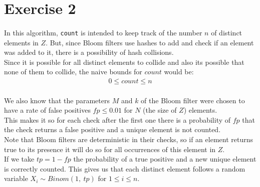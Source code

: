 \documentclass[../main.tex]{subfiles}
\begin{document}
\section{Exercise 2}
\label{sec:ex2}

\paragraph{} In this algorithm, \texttt{count} is intended to keep track of the number \(n\) of distinct elements in \(Z\). But, since Bloom filters use hashes to add and check if an element was added to it, there is a possibility of hash collisions. \\
Since it is possible for all distinct elements to collide and also its possible that none of them to collide, the naive bounds for \(count\) would be:
\begin{align*}
  0 \leq count \leq n
\end{align*}

\paragraph{} We also know that the parameters \(M\) and \(k\) of the Bloom filter were chosen to have a rate of false positives \(fp \leq 0.01\) for \(N\) (the size of \(Z\)) elements. \\
This makes it so for each check after the first one there is a probability of \(fp\) that the check returns a false positive and a unique element is not counted. \\
Note that Bloom filters are deterministic in their checks, so if an element returns true to its presence it will do so for all occurrences of this element in \(Z\). \\ 
If we take \(tp = 1 - fp\) the probability of a true positive and a new unique element is correctly counted. This gives us that each distinct element follows a random variable \(X_{i} \sim Binom(1,\ tp)\) for \(1 \leq i \leq n\).
\end{document}
